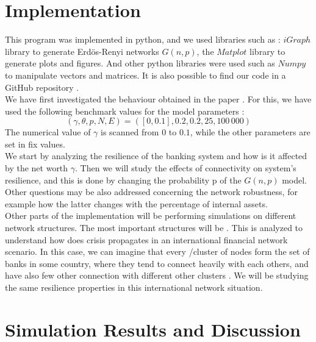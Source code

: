 \documentclass[14pt]{article}
\begin{document}
\section{Implementation}
This program was implemented in python, and we used libraries such as : $iGraph$ library to generate Erd{\"o}s-Renyi networks $G(n,p)$, the $Matplot$ library to generate plots and figures. And other python libraries were used such as $Numpy$ to manipulate vectors and matrices. It is also possible to find our code in a GitHub repository \cite{git}.
\\We have first investigated the behaviour obtained in the paper \cite{art1}. For this, we have used the following benchmark values for the model parameters :
\begin{equation*}
    (\gamma , \theta, p , N,E) = ([0,0.1], 0.2, 0.2, 25, 100\,000)
\end{equation*}
The numerical value of $\gamma$ is scanned from $0$ to $0.1$, while the other parameters are set in fix values. 
\\We start by analyzing the resilience of the banking system and how is it affected by the net worth $\gamma$. Then we will study the effects of connectivity on system's resilience, and this is done by changing the probability p of the $G(n,p)$ model. Other questions may be also addressed concerning the network robustness, for example how the latter changes with the percentage of internal assets.
\\ Other parts of the implementation will be performing simulations on different network structures. The most important structures will be . This is analyzed to understand how does crisis propagates in an international financial network scenario. In this case, we can imagine that every /cluster of nodes form the set of banks in some country, where they tend to connect heavily with each others, and have also few other connection with different other clusters . We will be studying the same resilience properties in this international network situation.
\section{Simulation Results and Discussion}
\end{document}
